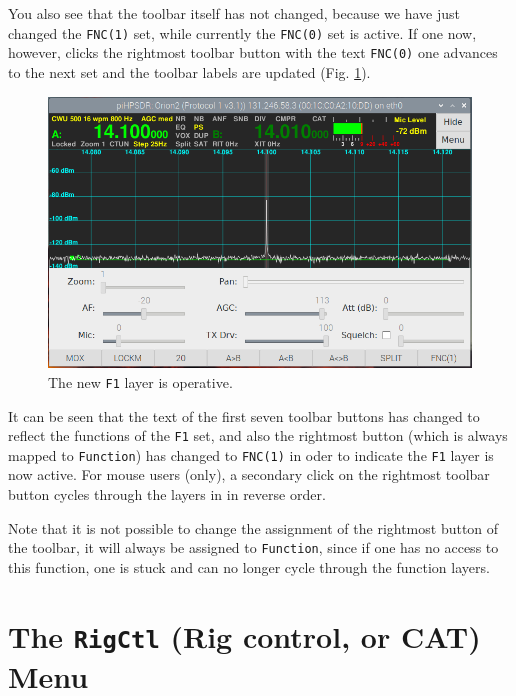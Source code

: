 \documentclass[12pt]{book}
\def\bltt#1{\texttt{\color{blue}#1}}
\begin{document}
You also see that the toolbar itself has not changed, because we have just changed the \texttt{FNC(1)} set,
while currently the \texttt{FNC(0)} set is active. If one now, however, clicks the rightmost
toolbar button with the text \texttt{FNC(0)} one advances to the next set and the toolbar labels
are updated (Fig. \ref{fig:ToolbarMenu5}).

\begin{figure}[ht!]
\center
\includegraphics[width=12cm]{ToolbarMenu5.png}
\caption{The new \texttt{F1} layer is operative.}
\label{fig:ToolbarMenu5}
\end{figure}

It can be seen that the text of the first seven toolbar buttons has changed to reflect
the functions of the \texttt{F1} set, and also the rightmost button (which is always mapped
to \bltt{Function}) has changed to \texttt{FNC(1)} in oder to indicate the \texttt{F1}
layer is now active. For mouse users (only), a secondary click on the rightmost toolbar
button cycles through the layers in in reverse order.

Note that it is not possible to change the assignment of the  rightmost button of the toolbar,
it will always be assigned to \bltt{Function}, since if one has no access to this
function, one is stuck and can no longer cycle through the function layers.

\section{The \texttt{RigCtl} (Rig control, or CAT) Menu}
\end{document}
